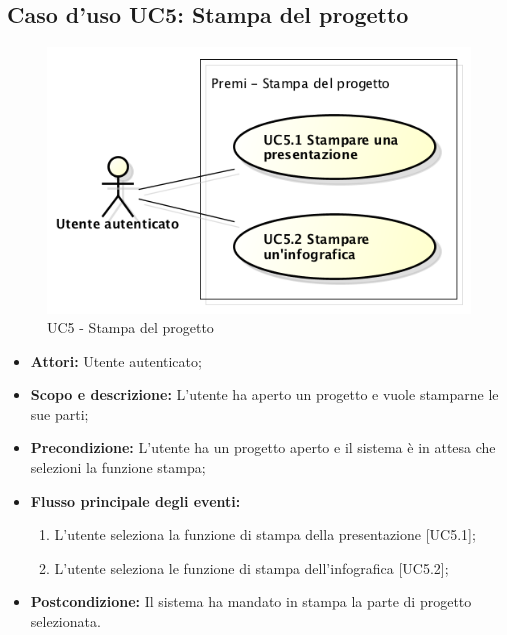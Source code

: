 \subsection{Caso d'uso UC5: Stampa del progetto}
\begin{figure}[h] 
	\centering 
	\includegraphics[scale=0.45] {img/UC5.png} 
	\caption{UC5 - Stampa del progetto} 
\end{figure}

\begin{itemize}
	\item \textbf{Attori:} Utente autenticato;
	\item \textbf{Scopo e descrizione:} L'utente ha aperto un progetto e vuole stamparne le sue parti;
	\item \textbf{Precondizione:} L'utente ha un progetto aperto e il sistema è in attesa che selezioni la funzione stampa;
	\item \textbf{Flusso principale degli eventi:}
	\begin{enumerate}
		\item L'utente seleziona la funzione di stampa della presentazione [UC5.1];
		\item L'utente seleziona le funzione di stampa dell'infografica [UC5.2];
	\end{enumerate}
	\item \textbf{Postcondizione:} Il sistema ha mandato in stampa la parte di progetto selezionata.
\end{itemize}


